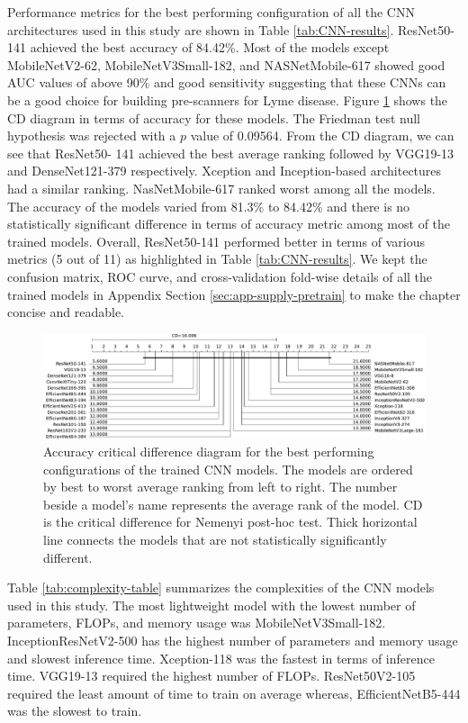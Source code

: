 Performance metrics for the best performing configuration of all the CNN architectures used in this study are shown in Table \ref{tab:CNN-results}. ResNet50-141 achieved the best accuracy of 84.42\%. Most of the models except MobileNetV2-62, MobileNetV3Small-182, and NASNetMobile-617 showed good AUC values of above 90\% and good sensitivity suggesting that these CNNs can be a good choice for building pre-scanners for Lyme disease. Figure \ref{fig:CD_SOTA} shows the CD diagram in terms of accuracy for these models. The Friedman test null hypothesis was rejected with a $p$ value of 0.09564. From the CD diagram, we can see that ResNet50- 141 achieved the best average ranking followed by VGG19-13 and DenseNet121-379 respectively. Xception and Inception-based architectures had a similar ranking. NasNetMobile-617 ranked worst among all the models. The accuracy of the models varied from 81.3\% to 84.42\% and there is no statistically significant difference in terms of accuracy metric among most of the trained models. Overall, ResNet50-141 performed better in terms of various metrics (5 out of 11) as highlighted in Table \ref{tab:CNN-results}. We kept the confusion matrix, ROC curve, and cross-validation fold-wise details of all the trained models in Appendix Section \ref{sec:app-supply-pretrain} to make the chapter concise and readable.
\begin{figure}[]
	\centering
	\includegraphics[width=\textwidth,keepaspectratio]{images/pretraining/CDAllSOTA-cropped.pdf}
	\caption[Accuracy critical difference diagram for the best performing configurations of the trained CNN models]{Accuracy critical difference diagram for the best performing configurations of the trained CNN models. The models are ordered by best to worst average ranking from left to right. The number beside a model’s name represents the average rank of the model. CD is the critical difference for Nemenyi post-hoc test. Thick horizontal line connects the models that are not statistically significantly different.}
	\label{fig:CD_SOTA}
\end{figure}

Table \ref{tab:complexity-table} summarizes the complexities of the CNN models used in this study.  The most lightweight model with the lowest number of parameters, FLOPs, and memory usage was MobileNetV3Small-182. InceptionResNetV2-500 has the highest number of parameters and memory usage and slowest inference time. Xception-118 was the fastest in terms of inference time. VGG19-13 required the highest number of FLOPs. ResNet50V2-105 required the least amount of time to train on average whereas, EfficientNetB5-444 was the slowest to train.


